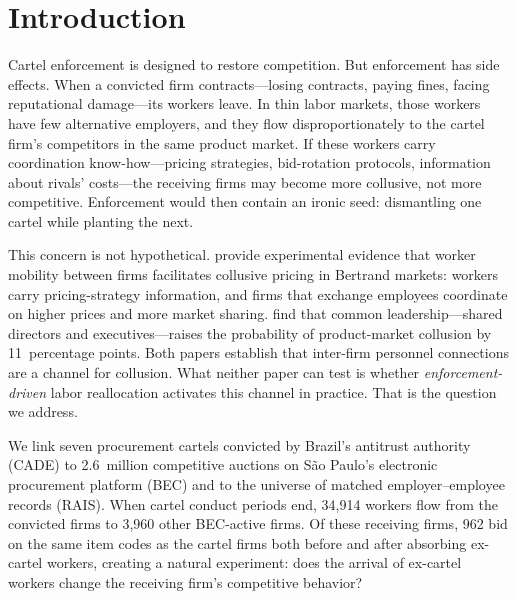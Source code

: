 \section{Introduction}\label{sec:intro}

Cartel enforcement is designed to restore competition. But enforcement has side effects. When a convicted firm contracts---losing contracts, paying fines, facing reputational damage---its workers leave. In thin labor markets, those workers have few alternative employers, and they flow disproportionately to the cartel firm's competitors in the same product market. If these workers carry coordination know-how---pricing strategies, bid-rotation protocols, information about rivals' costs---the receiving firms may become more collusive, not more competitive. Enforcement would then contain an ironic seed: dismantling one cartel while planting the next.

This concern is not hypothetical. \citet{lamichhane2024collusion} provide experimental evidence that worker mobility between firms facilitates collusive pricing in Bertrand markets: workers carry pricing-strategy information, and firms that exchange employees coordinate on higher prices and more market sharing. \citet{herrera2025collusion} find that common leadership---shared directors and executives---raises the probability of product-market collusion by 11~percentage points. Both papers establish that inter-firm personnel connections are a channel for collusion. What neither paper can test is whether \emph{enforcement-driven} labor reallocation activates this channel in practice. That is the question we address.

We link seven procurement cartels convicted by Brazil's antitrust authority (CADE) to 2.6~million competitive auctions on S\~{a}o Paulo's electronic procurement platform (BEC) and to the universe of matched employer--employee records (RAIS). When cartel conduct periods end, 34{,}914 workers flow from the convicted firms to 3{,}960 other BEC-active firms. Of these receiving firms, 962 bid on the same item codes as the cartel firms both before and after absorbing ex-cartel workers, creating a natural experiment: does the arrival of ex-cartel workers change the receiving firm's competitive behavior?

